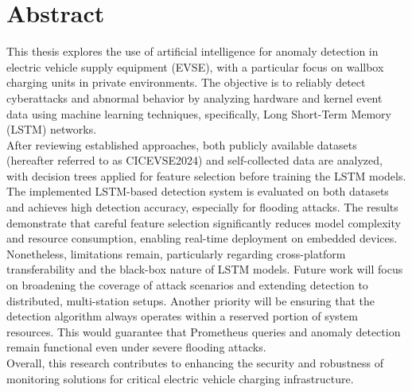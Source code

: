 \thispagestyle{empty}
\section*{Abstract}

\bigskip 
This thesis explores the use of artificial intelligence for anomaly detection in electric vehicle supply equipment (EVSE), with a particular focus on wallbox charging units in private environments. The objective is to reliably detect cyberattacks and abnormal behavior by analyzing hardware and kernel event data using machine learning techniques, specifically, Long Short-Term Memory (LSTM) networks.\\
After reviewing established approaches, both publicly available datasets (hereafter referred to as CICEVSE2024) and self-collected data are analyzed, with decision trees applied for feature selection before training the LSTM models.\\
The implemented LSTM-based detection system is evaluated on both datasets and achieves high detection accuracy, especially for flooding attacks. The results demonstrate that careful feature selection significantly reduces model complexity and resource consumption, enabling real-time deployment on embedded devices. Nonetheless, limitations remain, particularly regarding cross-platform transferability and the black-box nature of LSTM models. Future work will focus on broadening the coverage of attack scenarios and extending detection to distributed, multi-station setups. Another priority will be ensuring that the detection algorithm always operates within a reserved portion of system resources. This would guarantee that Prometheus queries and anomaly detection remain functional even under severe flooding attacks.\\
Overall, this research contributes to enhancing the security and robustness of monitoring solutions for critical electric vehicle charging infrastructure.